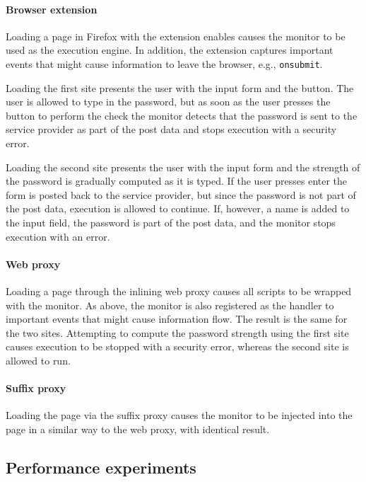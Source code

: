 \documentclass{llncs}
\begin{document}
\paragraph{Browser extension}
%
Loading a page in Firefox with the extension enables causes the monitor to be used
as the execution engine. In addition, the extension captures important events that
might cause information to leave the browser, e.g., \lstinline{onsubmit}. 

Loading the first site presents the user with the input form and the button. The user
is allowed to type in the password, but as soon as the user presses the button to perform
the check the monitor detects that the password is sent to the service provider
as part of the post data and stops execution with a security error.

Loading the second site presents the user with the input form and the strength of the password 
is gradually computed as it is typed. If the user presses enter the form is posted back to
the service provider, but since the password is not part of the post data, execution is
allowed to continue. If, however, a name is added to the input field, the password is part
of the post data, and the monitor stops execution with an error.


\paragraph{Web proxy}

Loading a page through the inlining web proxy causes all scripts to be wrapped
with the monitor. As above, the monitor is also registered as the handler to
important events that might cause information flow. The result is the same
for the two sites. Attempting to compute the password strength using the first
site causes execution to be stopped with a security error, whereas the second
site is allowed to run.

\paragraph{Suffix proxy}

Loading the page via the suffix proxy causes the monitor to be injected into the page in 
a similar way to the web proxy, with identical result.

\subsection{Performance experiments}
\end{document}
